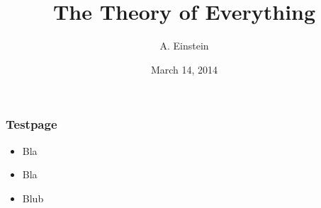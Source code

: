 \documentclass{beamer}
\title{The Theory of Everything}
\author{A. Einstein}
\date[14/3/14]{March 14, 2014}
\institute{University of Magratea}
\begin{document}
\begin{frame}[plain]
    \maketitle
\end{frame}

\begin{frame}[t]
    \frametitle{Testpage}
    \begin{itemize}
        \item Bla
        \item Bla
        \item Blub
    \end{itemize}
\end{frame}
\end{document}
